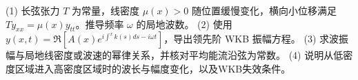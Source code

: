(1) 长弦张力 \(T\) 为常量，线密度 \(\mu(x)>0\) 随位置缓慢变化，横向小位移满足 \(T y_{xx}=\mu(x)y_{tt}\)。推导频率 \(\omega\) 的局地波数。
(2) 使用 \(y(x,t)=\Re[A(x)e^{i\int^x k(s)ds-i\omega t}]\)，导出领先阶 WKB 振幅方程。
(3) 求波振幅与局地线密度或波速的幂律关系，并核对平均能流沿弦为常数。
(4) 说明从低密度区域进入高密度区域时的波长与幅度变化，以及WKB失效条件。
